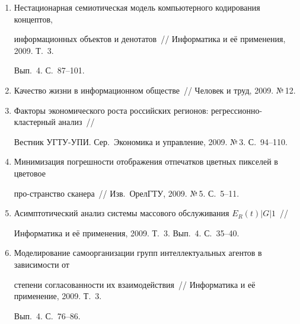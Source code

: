 \begin{enumerate}[1.]
\item {}


Нестационарная семиотическая модель компьютерного кодирования концептов, 


информационных объектов и денотатов~// Информатика и её применения, 2009. Т.~3. 


Вып.~4. С.~87--101.





\item {}


Качество жизни в информационном обществе~// Человек и труд,  2009. №\,12.





\item {}


Факторы экономического роста российских регионов: регрессионно-кластерный анализ~// 


Вестник УГТУ-УПИ. Сер.\ Экономика и управление, 2009. №\,3. С.~94--110.





\item {}


Минимизация погрешности отображения отпечатков цветных пикселей в цветовое 


про-\linebreak странство сканера~// Изв.\ ОрелГТУ, 2009.  №\,5. С.~5--11.





\item {}


Асимптотический анализ системы массового обслуживания $E_R(t)\vert G\vert 1$~// 


Информатика и её применения, 2009. Т.~3. Вып.~4. С.~35--40.





\item {}


Моделирование самоорганизации групп интеллектуальных агентов в зависимости от 


степени согласованности их взаимодействия~// Информатика и её применение, 2009. Т.~3. 


Вып.~4. С.~76--86.


\end{enumerate}






